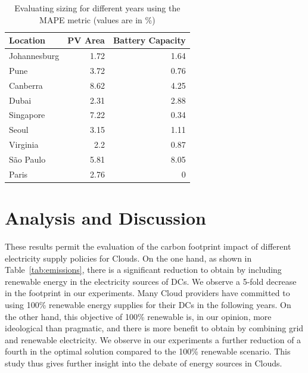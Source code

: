 \begin{table}[!ht]
  
  \caption{Evaluating sizing for different years using the MAPE metric (values are in \%) }\label{tab:years_MAPE} \centering

  \begin{tabular}{|l|r|r|}
   \hline
    
  \textbf{Location} &   \textbf{PV Area} & \textbf{Battery Capacity} \\
  \hline
  Johannesburg & 1.72 & 1.64  \\
  \hline
  Pune  & 3.72 & 0.76  \\
  \hline
  Canberra  & 8.62 & 4.25 \\
  \hline
  Dubai   & 2.31 & 2.88   \\
  \hline
  Singapore & 7.22 & 0.34 \\
  \hline     
  Seoul    & 3.15 & 1.11 \\
  \hline
  Virginia   & 2.2 & 0.87 \\
  \hline
  São Paulo   & 5.81 & 8.05 \\
  \hline 
  Paris    & 2.76 & 0     \\
  \hline  

\end{tabular}  
\end{table}



%
\section{Analysis and Discussion}
\label{sec:analysis-discussion_ccgrid}

These results permit the evaluation of the carbon footprint impact of different electricity supply policies for Clouds. On the one hand, as shown in Table~\ref{tab:emissions}, there is a significant reduction to obtain by including renewable energy in the electricity sources of DCs. We observe a 5-fold decrease in the footprint in our experiments. %
Many Cloud providers have committed to using 100\% renewable energy supplies for their DCs in the following years. On the other hand, this objective of 100\% renewable is, in our opinion, more ideological than pragmatic, and there is more benefit to obtain by combining grid and renewable electricity. We observe in our experiments a further reduction of a fourth in the optimal solution compared to the 100\% renewable scenario. This study thus gives further insight into the debate of energy sources in Clouds.


